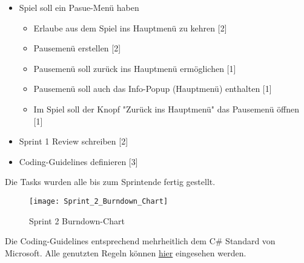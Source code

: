 \documentclass[../main.tex]{subfiles}
\begin{document}
\begin{itemize}
\begin{itemize}
		\end{itemize}
		\item Spiel soll ein Pasue-Menü haben
		\begin{itemize}
			\item Erlaube aus dem Spiel ins Hauptmenü zu kehren [2]
			\item Pausemenü erstellen [2]
			\item Pausemenü soll zurück ins Hauptmenü ermöglichen [1]
			\item Pausemenü soll auch das Info-Popup (Hauptmenü) enthalten [1]
			\item Im Spiel soll der Knopf "Zurück ins Hauptmenü" das Pausemenü öffnen [1]
		\end{itemize}
		\item Sprint 1 Review schreiben [2]
		\item Coding-Guidelines definieren [3]
	\end{itemize}

	\par Die Tasks wurden alle bis zum Sprintende fertig gestellt.
	
	\begin{figure}[H]
		\centering
		\texttt{[image: Sprint\_2\_Burndown\_Chart]}
		\caption{Sprint 2 Burndown-Chart}
	\end{figure}

	\par Die Coding-Guidelines entsprechend mehrheitlich dem C\# Standard von Microsoft. Alle genutzten Regeln können \href{https://github.com/ktaranov/naming-convention/blob/master/C#Coding Standards and Naming Conventions.md}{hier} eingesehen werden.
\end{document}
